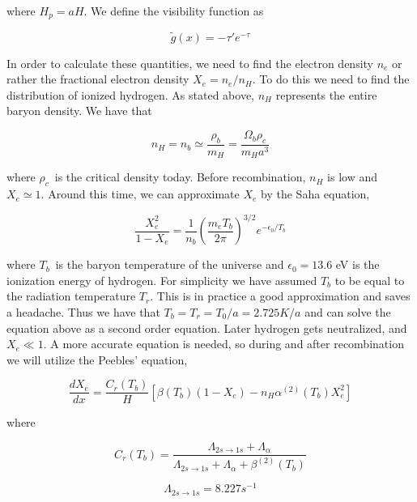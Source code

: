 \documentclass[norsk,a4paper,12pt]{article}
\begin{document}
where $H_p = aH$. We define the visibility function as

\begin{equation}
 \tilde{g}(x) = -\tau'e^{-\tau}
\end{equation}

In order to calculate these quantities, we need to find the electron density $n_e$ or rather the fractional electron density $X_e = n_e/n_H$. To do this we need to find the distribution of ionized hydrogen. As stated above, $n_H$ represents the entire baryon density. We have that

\begin{equation}
 n_H = n_b \simeq \frac{\rho_b}{m_H} = \frac{\Omega_b\rho_c}{m_Ha^3}
\end{equation}

where $\rho_c$ is the critical density today. Before recombination, $n_H$ is low and $X_e \simeq 1$. Around this time, we can approximate $X_e$ by the Saha equation, 

\begin{equation}
 \frac{X_e^2}{1 - X_e} = \frac{1}{n_b} (\frac{m_eT_b}{2\pi})^{3/2}e^{-\epsilon_0/T_b}
\end{equation}

where $T_b$ is the baryon temperature of the universe and $\epsilon_0 = 13.6$ eV is the ionization energy of hydrogen. For simplicity we have assumed $T_b$ to be equal to the radiation temperature $T_r$. This is in practice a good approximation and saves a headache. Thus we have that $T_b = T_r = T_0/a = 2.725 K/a$ and can solve the equation above as a second order equation. Later hydrogen gets neutralized, and $X_e \ll 1$. A more accurate equation is needed, so during and after recombination we will utilize the Peebles' equation,

\begin{equation}
 \frac{dX_e}{dx} = \frac{C_r(T_b)}{H}[\beta(T_b)(1-X_e) - n_H\alpha^{(2)}(T_b)X_e^2]
\end{equation}

where

\begin{equation}
 C_r(T_b) = \frac{\Lambda_{2s\rightarrow1s} + \Lambda_{\alpha}}{\Lambda_{2s\rightarrow1s} + \Lambda_{\alpha} + \beta^{(2)}(T_b)}
\end{equation}

\begin{equation}
 \Lambda_{2s\rightarrow1s} = 8.227 s^{-1}
\end{equation}
\end{document}
